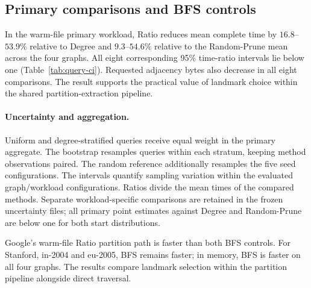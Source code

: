 \clearpage
\subsection{Primary comparisons and BFS controls}
In the warm-file primary workload, Ratio reduces mean complete time by $16.8$--$53.9\%$ relative to Degree and $9.3$--$54.6\%$ relative to the Random-Prune mean across the four graphs. All eight corresponding 95\% time-ratio intervals lie below one (Table~\ref{tab:query-ci}). Requested adjacency bytes also decrease in all eight comparisons. The result supports the practical value of landmark choice within the shared partition-extraction pipeline.

\begin{table}[H]
\centering\tablefont\setlength{\tabcolsep}{5pt}
\caption{Primary warm-file comparisons. Ratios are Ratio/reference, so values below one favor Ratio. Confidence intervals are paired stratified bootstrap percentile intervals with 2,000 resamples; random configurations are resampled as well as queries.}
\label{tab:query-ci}

\end{table}

\paragraph{Uncertainty and aggregation.}
Uniform and degree-stratified queries receive equal weight in the primary aggregate. The bootstrap resamples queries within each stratum, keeping method observations paired. The random reference additionally resamples the five seed configurations. The intervals quantify sampling variation within the evaluated graph/workload configurations. Ratios divide the mean times of the compared methods. Separate workload-specific comparisons are retained in the frozen uncertainty files; all primary point estimates against Degree and Random-Prune are below one for both start distributions.

\begin{table}[H]
\centering\tablefont\setlength{\tabcolsep}{5pt}
\caption{Primary workload BFS controls. Times are mean microseconds. Same-layout BFS uses Ratio's physical layout. The last column divides Ratio partition time by same-layout BFS time.}
\label{tab:bfs}

\end{table}

Google's warm-file Ratio partition path is faster than both BFS controls. For Stanford, in-2004 and eu-2005, BFS remains faster; in memory, BFS is faster on all four graphs. The results compare landmark selection within the partition pipeline alongside direct traversal.


